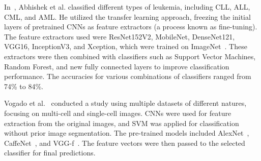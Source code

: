 In~\cite{ABHISHEK2023}, Abhishek et al. classified different types of leukemia, including CLL, ALL, CML, and AML. He utilized the transfer learning approach, freezing the initial layers of pretrained CNNs as feature extractors (a process known as fine-tuning). The feature extractors used were ResNet152V2, MobileNet, DenseNet121, VGG16, InceptionV3, and Xception, which were trained on ImageNet~\cite{Russakovsky2015}. These extractors were then combined with classifiers such as Support Vector Machines, Random Forest, and new fully connected layers to improve classification performance. The accuracies for various combinations of classifiers ranged from 74\% to 84\%.

Vogado et al.~\cite{VOGADO2018} conducted a study using multiple datasets of different natures, focusing on multi-cell and single-cell images. CNNs were used for feature extraction from the original images, and SVM was applied for classification without prior image segmentation. The pre-trained models included AlexNet~\cite{Krizhevsky2012}, CaffeNet~\cite{Jia2014}, and VGG-f~\cite{Chatfield2014}. The feature vectors were then passed to the selected classifier for final predictions.